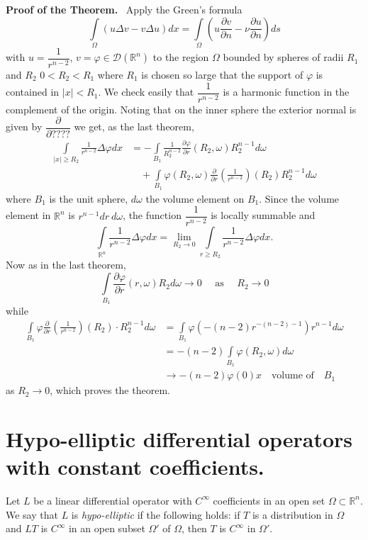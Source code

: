 \noindent
{\bf Proof of the Theorem.}~
Apply the Green's formula
$$
\int\limits_{\Omega}(u\Delta v-v\Delta u)dx=\int\limits_{\Omega}\left(u\dfrac{\partial v}{\partial n}-\nu \frac{\partial u}{\partial n}\right)ds
$$
with $u=\dfrac{1}{r^{n-2}}$, $v=\varphi\in \mathcal{D}(\mathbb{R}^{n})$ to the region $\Omega$ bounded by spheres of radii $R_{1}$ and $R_{2}$ $0<R_{2}<R_{1}$ where $R_{1}$ is chosen so large that the support of $\varphi$ is contained in $|x|<R_{1}$. We check easily that $\dfrac{1}{r^{n-2}}$ is a harmonic function in the complement of the origin. Noting that on the inner sphere the exterior normal is given by $\dfrac{\partial}{\partial ????}$ we get, as the last theorem,
\begin{align*}
\int\limits_{|x|\geq R_{2}}\frac{1}{r^{n-2}}\Delta \varphi dx &= -\int\limits_{B_{1}}\frac{1}{R^{n-2}_{2}}\frac{\partial \varphi}{\partial r}(R_{2},\omega)R^{n-1}_{2}d\omega\\[4pt]
&\quad + \int\limits_{B_{1}}\varphi (R_{2},\omega)\frac{\partial}{\partial r}\left(\frac{1}{r^{n-2}}\right)(R_{2})R^{n-1}_{2}d\omega
\end{align*}\pageoriginale
where $B_{1}$ is the unit sphere, $d\omega$ the volume element on $B_{1}$. Since the volume element in $\mathbb{R}^{n}$ is $r^{n-1} dr \ d\omega$, the function $\dfrac{1}{r^{n-2}}$ is locally summable and
$$
\int\limits_{\mathbb{R}^{n}}\frac{1}{r^{n-2}}\Delta \varphi dx = \lim\limits_{R_{2}\to 0}\int\limits_{r\geq R_{2}}\frac{1}{r^{n-2}}\Delta \varphi dx.
$$
Now as in the last theorem,
$$
\int\limits_{B_{1}}\frac{\partial \varphi}{\partial r}(r,\omega)R_{2}d\omega \to 0\text{~~~ as~~~ } R_{2}\to 0
$$
while
\begin{align*}
\int\limits_{B_{1}}\varphi \frac{\partial}{\partial r}\left(\frac{1}{r^{n-2}}\right)(R_{2})\cdot R^{n-1}_{2}d\omega &= \int\limits_{B_{1}}\varphi\left(-(n-2)r^{-(n-2)-1}\right)r^{n-1}d\omega\\[4pt]
&= -(n-2)\int\limits_{B_{1}}\varphi(R_{2},\omega)d\omega\\[4pt]
&\to -(n-2)\varphi(0)x\text{~~ volume of~~ } B_{1}
\end{align*}
as $R_{2}\to 0$, which proves the theorem.

\section*{Hypo-elliptic differential operators with constant coefficients.}

\begin{defi*}
Let $L$ be a linear differential operator with $C^{\infty}$ coefficients in an open set $\Omega \subset \mathbb{R}^{n}$. We say that $L$ is {\em hypo-elliptic} if the following holds: if $T$ is a distribution in $\Omega$ and $LT$ is $C^{\infty}$ in an open subset $\Omega'$ of $\Omega$, then $T$ is $C^{\infty}$ in $\Omega'$.
\end{defi*}

